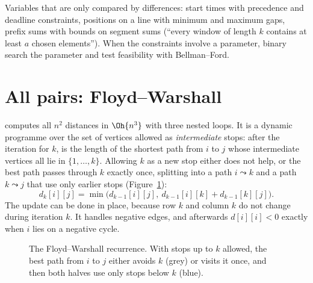 
\begin{recognize}
Variables that are only compared by differences: start times with precedence and deadline constraints, positions on a line
with minimum and maximum gaps, prefix sums with bounds on segment sums (``every window of length $k$ contains at least $a$
chosen elements''). When the constraints involve a parameter, binary search the parameter and test feasibility with
Bellman--Ford.
\end{recognize}

\section[All pairs: Floyd--Warshall]{All pairs: Floyd--Warshall \hfill \gold}\label{sec:floyd}

 computes all $n^2$ distances in $\Oh{n^3}$ with three nested loops. It is a dynamic programme over the set
of vertices allowed as \emph{intermediate} stops: after the iteration for $k$,  is the length of the shortest path
from $i$ to $j$ whose intermediate vertices all lie in $\{1, \ldots, k\}$. Allowing $k$ as a new stop either does not help, or
the best path passes through $k$ exactly once, splitting into a path $i \leadsto k$ and a path $k \leadsto j$ that use only
earlier stops (Figure~\ref{fig:floyd}):
\[
  d_k[i][j] = \min\bigl(d_{k-1}[i][j],\ d_{k-1}[i][k] + d_{k-1}[k][j]\bigr) .
\]
The update can be done in place, because row $k$ and column $k$ do not change during iteration $k$. It handles negative edges,
and afterwards $d[i][i] < 0$ exactly when $i$ lies on a negative cycle.

\begin{figure}[htbp]
\centering
{}
\caption{The Floyd--Warshall recurrence. With stops up to $k$ allowed, the best path from $i$ to $j$ either avoids $k$ (grey)
or visits it once, and then both halves use only stops below $k$ (blue).}
\label{fig:floyd}
\end{figure}

